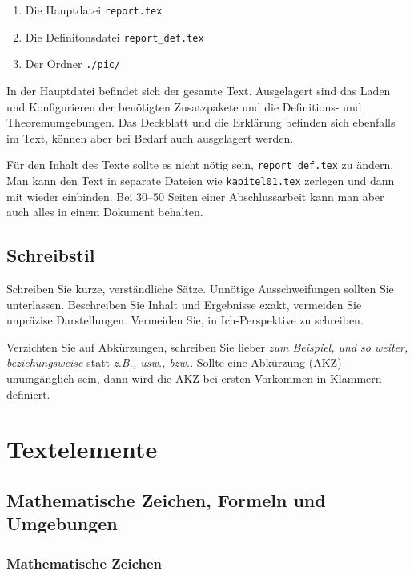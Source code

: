 \documentclass[10pt]{report}
\begin{document}
\begin{enumerate}
\item Die Hauptdatei \verb|report.tex|
\item Die Definitonsdatei \verb|report_def.tex|
\item Der Ordner \verb|./pic/|
\end{enumerate}

In der Hauptdatei befindet sich der gesamte Text. Ausgelagert sind das Laden und Konfigurieren der ben\"otigten Zusatzpakete und die Definitions- und Theoremumgebungen. Das Deckblatt und die Erkl\"arung befinden sich ebenfalls im Text, k\"onnen aber bei Bedarf auch ausgelagert werden. 

F\"ur den Inhalt des Texte sollte es nicht n\"otig sein, \verb|report_def.tex| zu \"andern.
Man kann den Text in separate Dateien wie \verb|kapitel01.tex| zerlegen und dann mit \verb|| wieder einbinden. Bei 30--50 Seiten einer Abschlussarbeit kann man aber auch alles in einem Dokument behalten.

\section{Schreibstil} 

Schreiben Sie kurze, verst\"andliche S\"atze. Unn\"otige Ausschweifungen sollten Sie unterlassen. Beschreiben Sie Inhalt und Ergebnisse exakt, vermeiden Sie unpr\"azise Darstellungen. Vermeiden Sie, in Ich-Perspektive zu schreiben. 

Verzichten Sie auf Abk\"urzungen, schreiben Sie lieber \textit{zum Beispiel, und so weiter, beziehungsweise} statt \textit{z.B., usw., bzw.}. Sollte eine Abk\"urzung (AKZ) unumg\"anglich sein, dann wird die AKZ bei ersten Vorkommen in Klammern definiert.

\chapter{Textelemente}

\section{Mathematische Zeichen, Formeln und Umgebungen}\label{sec:math}

\subsection{Mathematische Zeichen}
\end{document}
